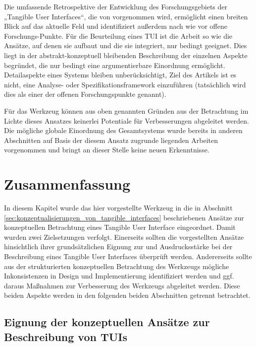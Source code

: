 Die umfassende Retrospektive der Entwicklung des Forschungsgebiets der „Tangible User Interfaces“, die von \citep{Ishii08} vorgenommen wird, ermöglicht einen breiten Blick auf das aktuelle Feld und identifiziert außerdem nach wie vor offene Forschungs-Punkte. Für die Beurteilung eines \gls{TUI} ist die Arbeit so wie die Ansätze, auf denen sie aufbaut und die sie integriert, nur bedingt geeignet. Dies liegt in der abstrakt-konzeptuell bleibenden Beschreibung der einzelnen Aspekte begründet, die nur bedingt eine argumentierbare Einordnung ermöglicht. Detailaspekte eines Systems bleiben unberücksichtigt, Ziel des Artikels ist es nicht, eine Analyse- oder Spezifikationsframework einzuführen (tatsächlich wird dies als einer der offenen Forschungspunkte genannt).

Für das Werkzeug können aus oben genannten Gründen aus der Betrachtung im Lichte dieses Ansatzes keinerlei Potentiale für 
Verbesserungen abgeleitet werden. Die mögliche globale Einordnung des Gesamtsystems wurde bereits in anderen Abschnitten auf Basis der diesem Ansatz zugrunde liegenden Arbeiten vorgenommen und bringt an dieser Stelle keine neuen Erkenntnisse.


\section{Zusammenfassung} %
\label{sec:konz_eval_zusammenfassung}

In diesem Kapitel wurde das hier vorgestellte Werkzeug in die in Abschnitt \ref{sec:konzeptualisierungen_von_tangible_interfaces} beschriebenen Ansätze zur konzeptuellen Betrachtung eines Tangible User Interface eingeordnet. Damit wurden zwei Zielsetzungen verfolgt. Einerseits sollten die vorgestellten Ansätze hinsichtlich ihrer grundsätzlichen Eignung zur und Ausdrucksstärke bei der Beschreibung eines Tangible User Interfaces überprüft werden. Andererseits sollte aus der strukturierten konzeptuellen Betrachtung des Werkzeugs mögliche Inkonsistenzen in Design und Implementierung identifiziert werden und ggf. daraus Maßnahmen zur Verbesserung des Werkzeugs abgeleitet werden. Diese beiden Aspekte werden in den folgenden beiden Abschnitten getrennt betrachtet.

\subsection{Eignung der konzeptuellen Ansätze zur Beschreibung von TUIs} %
\label{sub:eignung_der_konzeptuellen_ansätze}

